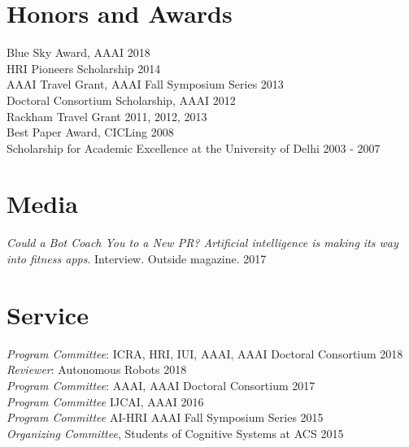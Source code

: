 \documentclass[margin,line,11pt]{res}
\begin{document}
\begin{resume}
\section{\sc Honors and Awards}
Blue Sky Award, AAAI \hfill 2018\\
HRI Pioneers Scholarship \hfill 2014\\
AAAI Travel Grant, AAAI Fall Symposium Series \hfill 2013\\
Doctoral Consortium Scholarship, AAAI \hfill 2012 \\
Rackham Travel Grant \hfill 2011, 2012, 2013 \\
Best Paper Award, CICLing \hfill 2008 \\
Scholarship for Academic Excellence at the University of Delhi \hfill 2003 - 2007

\section{\sc Media}
\emph{Could a Bot Coach You to a New PR? Artificial intelligence is making its way into fitness apps}. Interview. Outside magazine. \hfill 2017


\section{\sc Service}
\emph{Program Committee}: ICRA, HRI, IUI, AAAI, AAAI Doctoral Consortium \hfill 2018\\
\emph{Reviewer}: Autonomous  Robots \hfill 2018\\
\emph{Program Committee}: AAAI, AAAI Doctoral Consortium \hfill 2017\\
\emph{Program Committee} IJCAI, AAAI \hfill 2016\\
\emph{Program Committee} AI-HRI AAAI Fall Symposium Series \hfill 2015\\
\emph{Organizing Committee}, Students of Cognitive Systems at ACS \hfill 2015\\










\end{resume}
\end{document}
